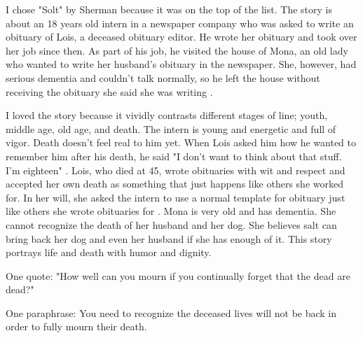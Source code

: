 \documentclass[10pt,a4paper]{article}
\begin{document}
  I chose "Solt" by Sherman because it was on the top of the list. The story is about an 18 years old intern in a newspaper company who was asked to write an obituary of Lois, a deceased obituary editor. He wrote her obituary and took over her job since then. As part of his job, he visited the house of Mona, an old lady who wanted to write her husband's obituary in the newspaper. She, however, had serious dementia and couldn't talk normally, so he left the house without receiving the obituary she said she was writing \citep{SaltShermanND}.

  I loved the story because it vividly contrasts different stages of line; youth, middle age, old age, and death. The intern is young and energetic and full of vigor. Death doesn't feel real to him yet. When Lois asked him how he wanted to remember him after his death, he said "I don’t want to think about that stuff. I’m eighteen" \citep{SaltShermanND}. Lois, who died at 45, wrote obituaries with wit and respect and accepted her own death as something that just happens like others she worked for. In her will, she asked the intern to use a normal template for obituary just like others she wrote obituaries for \citep{SaltShermanND}. Mona is very old and has dementia. She cannot recognize the death of her husband and her dog. She believes salt can bring back her dog and even her husband if she has enough of it. This story portrays life and death with humor and dignity.

One quote:
"How well can you mourn if you continually forget that the dead are dead?" \citep{SaltShermanND}

One paraphrase:
You need to recognize the deceased lives will not be back in order to fully mourn their death. \citep{SaltShermanND}



\end{document}
